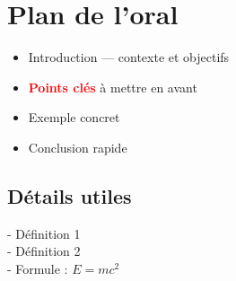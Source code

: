 \documentclass[10pt,a5paper]{article}
\newcommand{\important}[1]{\textbf{\textcolor{red}{#1}}}
\begin{document}
\section*{Plan de l'oral}

\begin{itemize}
  \item Introduction — contexte et objectifs
  \item \important{Points clés} à mettre en avant
  \item Exemple concret
  \item Conclusion rapide
\end{itemize}

\begin{multicols}{2}
\subsection*{Détails utiles}
- Définition 1 \\
- Définition 2 \\
- Formule : $E = mc^2$
\end{multicols}
\end{document}
